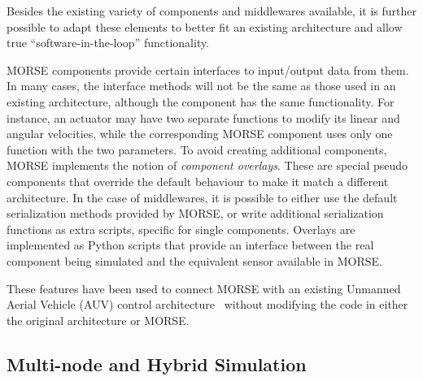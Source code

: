 \documentclass{llncs}
\begin{document}
Besides the existing variety of components and middlewares available, it is
further possible to adapt these elements to better fit an existing
architecture and allow true ``software-in-the-loop'' functionality.

MORSE components provide certain interfaces to input/output data from them. In
many cases, the interface methods will not be the same as those used in an
existing architecture, although the component has the same functionality.
For instance, an actuator may have two separate functions to modify its linear
and angular velocities, while the corresponding MORSE component uses only one
function with the two parameters. To avoid creating additional components,
MORSE implements the notion of \emph{component overlays}. These are
special pseudo components that override the default
behaviour to make it match a different architecture.
In the case of middlewares, it is possible to either use the default
serialization methods provided by MORSE, or write additional serialization
functions as extra scripts, specific for single components.
Overlays are implemented as Python scripts that provide an interface between
the real component being simulated and the equivalent sensor available in
MORSE.

These features have been used to connect MORSE with an existing
Unmanned Aerial Vehicle (AUV) control architecture~\cite{barbier2011}
without modifying the code in either the original architecture or MORSE.


\subsection{Multi-node and Hybrid Simulation}
\label{section:multinode}
\end{document}
